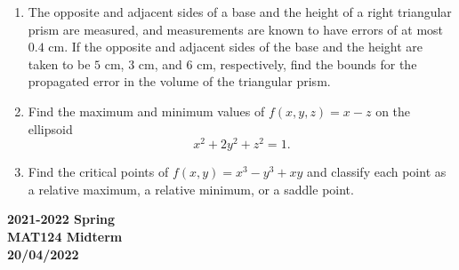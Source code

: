 \documentclass[a4paper, 12pt]{article}
\begin{document}
\begin{enumerate}[leftmargin=*,label=\textbf{\arabic*.}]
\item The opposite and adjacent sides of a base and the height of a right triangular prism are measured, and measurements are known to have errors of at most $0.4$ cm. If the opposite and adjacent sides of the base and the height are taken to be $5$ cm, $3$ cm, and $6$ cm, respectively, find the bounds for the propagated error in the volume of the triangular prism.

\item Find the maximum and minimum values of $f(x,y,z)=x-z$ on the ellipsoid
\[x^2+2y^2+z^2=1.\]

\item Find the critical points of $f(x,y)=x^3-y^3+xy$ and classify each point as a relative maximum, a relative minimum, or a saddle point.
\end{enumerate}
\newpage
{}
{}

\begin{center}
\textbf{2021-2022 Spring \\MAT124 Midterm\\20/04/2022}
\end{center}
\end{document}
